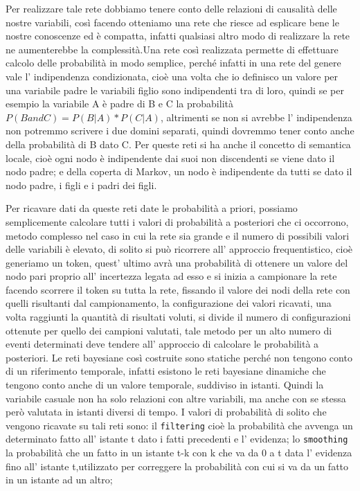 		Per realizzare tale rete dobbiamo tenere conto delle relazioni di causalità delle nostre variabili, così facendo otteniamo una rete che riesce ad esplicare bene le nostre conoscenze ed è compatta, infatti qualsiasi altro modo di realizzare la rete ne aumenterebbe la complessità.Una rete così realizzata permette di effettuare calcolo delle probabilità in modo semplice, perché infatti in una rete del genere vale l' indipendenza condizionata, cioè una volta che io definisco un valore per una variabile padre le variabili figlio sono indipendenti tra di loro, quindi se per esempio la variabile A è padre di B e C la probabilità $P(B and C)=P(B|A)*P(C|A)$, altrimenti se non si avrebbe l' indipendenza non potremmo scrivere i due domini separati, quindi dovremmo tener conto anche della probabilità di B dato C. Per queste reti si ha anche il concetto di semantica locale, cioè ogni nodo è indipendente dai suoi non discendenti se viene dato il nodo padre; e della coperta di Markov, un nodo è indipendente da tutti se dato il nodo padre, i figli e i padri dei figli.
		\par  
		Per ricavare dati da queste reti date le probabilità a priori, possiamo semplicemente calcolare tutti i valori di probabilità a posteriori che ci occorrono, metodo complesso nel caso in cui la rete sia grande e il numero di possibili valori delle variabili è elevato, di solito si può ricorrere all' approccio frequentistico, cioè generiamo un token, quest' ultimo avrà una probabilità di ottenere un valore del nodo pari proprio all' incertezza legata ad esso e si inizia a campionare la rete facendo scorrere il token su tutta la rete, fissando il valore dei nodi della rete con quelli risultanti dal campionamento, la configurazione dei valori ricavati, una volta raggiunti la quantità di risultati voluti, si divide il numero di configurazioni ottenute per quello dei campioni valutati, tale metodo per un alto numero di eventi determinati deve tendere all' approccio di calcolare le probabilità a posteriori. Le reti bayesiane così costruite sono statiche perché non tengono conto di un riferimento temporale, infatti esistono le reti bayesiane dinamiche che tengono conto anche di un valore temporale, suddiviso in istanti. Quindi la variabile casuale non ha solo relazioni con altre variabili, ma anche con se stessa però valutata in istanti diversi di tempo. I valori di probabilità di solito che vengono ricavate su tali reti sono: il \texttt{filtering} cioè la probabilità che avvenga un determinato fatto all' istante t dato i fatti precedenti e l' evidenza; lo \texttt{smoothing} la probabilità che un fatto in un istante t-k con k che va da 0 a t data l' evidenza fino all' istante t,utilizzato per correggere la probabilità con cui si va da un fatto in un istante ad un altro;
